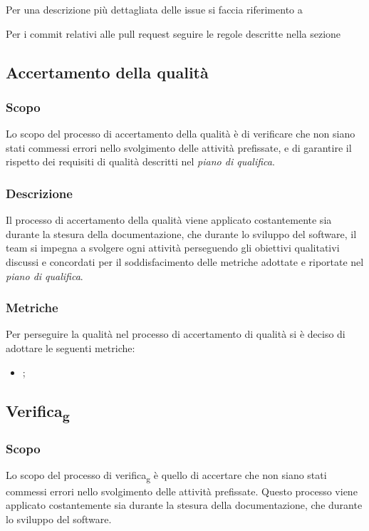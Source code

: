         Per una descrizione più dettagliata delle issue si faccia riferimento a 

        Per i commit relativi alle pull request seguire le regole descritte nella sezione 

    \subsection{Accertamento della qualità}
    \subsubsection{Scopo}
    Lo scopo del processo di accertamento della qualità è di verificare che non siano stati commessi errori nello svolgimento delle attività prefissate, e di garantire il rispetto dei requisiti di qualità descritti nel \textit{piano di qualifica}.
    \subsubsection{Descrizione}
    Il processo di accertamento della qualità viene applicato costantemente sia durante la stesura della documentazione, che durante lo sviluppo del software, il team si impegna a svolgere ogni attività perseguendo gli obiettivi qualitativi discussi e concordati per il soddisfacimento delle metriche adottate e riportate nel \textit{piano di qualifica}.    

        \subsubsection{Metriche}
        Per perseguire la qualità nel processo di accertamento di qualità si è deciso di adottare le seguenti metriche:
        \begin{itemize}
                \item {};
        \end{itemize}
    \subsection{Verifica\textsubscript{g}}
        \subsubsection{Scopo}
        Lo scopo del processo di verifica\textsubscript{g} è quello di accertare che non siano stati commessi errori nello svolgimento
        delle attività prefissate. Questo processo viene applicato costantemente sia durante la stesura
        della documentazione, che durante lo sviluppo del software.

